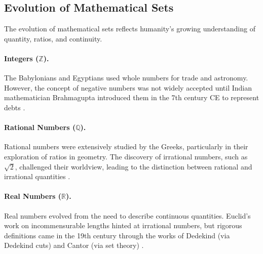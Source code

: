 \subsection{Evolution of Mathematical Sets}

The evolution of mathematical sets reflects humanity's growing understanding of quantity, ratios, and continuity.

\paragraph{Integers (\( \mathbb{Z} \)).}
The Babylonians and Egyptians used whole numbers for trade and astronomy. However, the concept of negative numbers was not widely accepted until Indian mathematician Brahmagupta introduced them in the 7th century CE to represent debts \cite{burton2010-number}. 

\paragraph{Rational Numbers (\( \mathbb{Q} \)).}
Rational numbers were extensively studied by the Greeks, particularly in their exploration of ratios in geometry. The discovery of irrational numbers, such as \( \sqrt{2} \), challenged their worldview, leading to the distinction between rational and irrational quantities \cite{maor2007}.

\paragraph{Real Numbers (\( \mathbb{R} \)).}
Real numbers evolved from the need to describe continuous quantities. Euclid's work on incommensurable lengths hinted at irrational numbers, but rigorous definitions came in the 19th century through the works of Dedekind (via Dedekind cuts) and Cantor (via set theory) \cite{rosen2018}.

